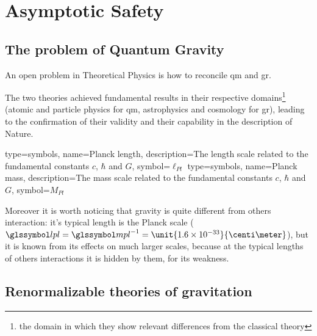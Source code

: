 
\chapter{Asymptotic Safety}
\label{cap:AsSty}
\label{cap:assty}
\minitoc
\adjustmtc

\section{The problem of Quantum Gravity}
\label{sec:problemQG}


An open problem in Theoretical Physics is how to reconcile \acrfull{qm} and \acrfull{gr}.

The two theories achieved fundamental results in their respective domains\footnote{the domain in which they show relevant differences from the classical theory} (atomic and particle physics for \acrshort{qm}, astrophysics and cosmology for \acrshort{gr}), leading to the confirmation of their validity and their capability in the description of Nature.
\newline

{
	type=symbols,
	name={Planck length},
	description={The length scale related to the fundamental constants $ c $, $ \hbar $ and $ G $},
	symbol={\ensuremath{\ell_{Pl}}}
}
{
	type=symbols,
	name={Planck mass},
	description={The mass scale related to the fundamental constants $ c $, $ \hbar $ and $ G $},
	symbol={\ensuremath{M_{Pl}}}
}

Moreover it is worth noticing that gravity is quite different from others interaction: it's typical length is the Planck scale ($ \gsym{lpl} = \gsym{mpl}^{-1} = \unit{1.6 \times 10^{-33}}{\centi\meter} $), but it is known from its effects on much larger scales, because at the typical lengths of others interactions it is hidden by them, for its weakness.


\section{Renormalizable theories of gravitation}
\label{sec:ReThGrav}


